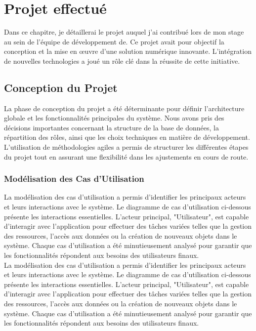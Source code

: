 \chapter{Projet effectué}

Dans ce chapitre, je détaillerai le projet auquel j'ai contribué lors de mon stage au sein de l'équipe de développement de. Ce projet avait pour objectif la conception et la mise en œuvre d'une solution numérique innovante. L'intégration de nouvelles technologies a joué un rôle clé dans la réussite de cette initiative.

\section{Conception du Projet}

La phase de conception du projet a été déterminante pour définir l'architecture globale et les fonctionnalités principales du système. Nous avons pris des décisions importantes concernant la structure de la base de données, la répartition des rôles, ainsi que les choix techniques en matière de développement. L'utilisation de méthodologies agiles a permis de structurer les différentes étapes du projet tout en assurant une flexibilité dans les ajustements en cours de route.

\subsection{Modélisation des Cas d'Utilisation}

La modélisation des cas d'utilisation a permis d'identifier les principaux acteurs et leurs interactions avec le système. Le diagramme de cas d'utilisation ci-dessous présente les interactions essentielles. L'acteur principal, "Utilisateur", est capable d'interagir avec l'application pour effectuer des tâches variées telles que la gestion des ressources, l'accès aux données ou la création de nouveaux objets dans le système. Chaque cas d'utilisation a été minutieusement analysé pour garantir que les fonctionnalités répondent aux besoins des utilisateurs finaux.\\
La modélisation des cas d'utilisation a permis d'identifier les principaux acteurs et leurs interactions avec le système. Le diagramme de cas d'utilisation ci-dessous présente les interactions essentielles. L'acteur principal, "Utilisateur", est capable d'interagir avec l'application pour effectuer des tâches variées telles que la gestion des ressources, l'accès aux données ou la création de nouveaux objets dans le système. Chaque cas d'utilisation a été minutieusement analysé pour garantir que les fonctionnalités répondent aux besoins des utilisateurs finaux.
\clearpage
